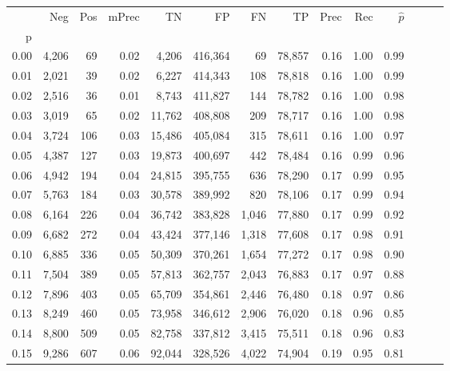 \begin{tabular}{rrrrrrrrrrrrrr}
\toprule
{} &     Neg &    Pos & mPrec &       TN &       FP &      FN &      TP &  Prec &   Rec & $\hat{p}$ \\
p    &         &        &       &          &          &         &         &       &       &           \\
\midrule
0.00 &   4,206 &     69 &  0.02 &    4,206 &  416,364 &      69 &  78,857 &  0.16 &  1.00 &      0.99 \\
0.01 &   2,021 &     39 &  0.02 &    6,227 &  414,343 &     108 &  78,818 &  0.16 &  1.00 &      0.99 \\
0.02 &   2,516 &     36 &  0.01 &    8,743 &  411,827 &     144 &  78,782 &  0.16 &  1.00 &      0.98 \\
0.03 &   3,019 &     65 &  0.02 &   11,762 &  408,808 &     209 &  78,717 &  0.16 &  1.00 &      0.98 \\
0.04 &   3,724 &    106 &  0.03 &   15,486 &  405,084 &     315 &  78,611 &  0.16 &  1.00 &      0.97 \\
0.05 &   4,387 &    127 &  0.03 &   19,873 &  400,697 &     442 &  78,484 &  0.16 &  0.99 &      0.96 \\
0.06 &   4,942 &    194 &  0.04 &   24,815 &  395,755 &     636 &  78,290 &  0.17 &  0.99 &      0.95 \\
0.07 &   5,763 &    184 &  0.03 &   30,578 &  389,992 &     820 &  78,106 &  0.17 &  0.99 &      0.94 \\
0.08 &   6,164 &    226 &  0.04 &   36,742 &  383,828 &   1,046 &  77,880 &  0.17 &  0.99 &      0.92 \\
0.09 &   6,682 &    272 &  0.04 &   43,424 &  377,146 &   1,318 &  77,608 &  0.17 &  0.98 &      0.91 \\
0.10 &   6,885 &    336 &  0.05 &   50,309 &  370,261 &   1,654 &  77,272 &  0.17 &  0.98 &      0.90 \\
0.11 &   7,504 &    389 &  0.05 &   57,813 &  362,757 &   2,043 &  76,883 &  0.17 &  0.97 &      0.88 \\
0.12 &   7,896 &    403 &  0.05 &   65,709 &  354,861 &   2,446 &  76,480 &  0.18 &  0.97 &      0.86 \\
0.13 &   8,249 &    460 &  0.05 &   73,958 &  346,612 &   2,906 &  76,020 &  0.18 &  0.96 &      0.85 \\
0.14 &   8,800 &    509 &  0.05 &   82,758 &  337,812 &   3,415 &  75,511 &  0.18 &  0.96 &      0.83 \\
0.15 &   9,286 &    607 &  0.06 &   92,044 &  328,526 &   4,022 &  74,904 &  0.19 &  0.95 &      0.81 \\

\end{tabular}
